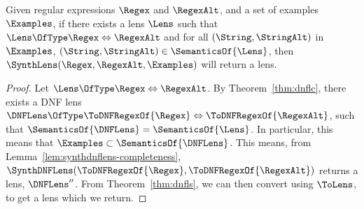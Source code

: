 \documentclass[acmsmall,screen]{acmart}
\begin{document}
\begin{theorem}
  Given regular expressions $\Regex$ and $\RegexAlt$, and a set
  of examples $\Examples$, if there exists a lens $\Lens$ such that
  $\Lens \OfType \Regex \Leftrightarrow \RegexAlt$ and for all
  $(\String,\StringAlt)$ in $\Examples$, $(\String,\StringAlt) \in
  \SemanticsOf{\Lens}$, then $\SynthLens(\Regex,\RegexAlt,\Examples)$ will
  return a lens.
\end{theorem}
\begin{proof}
  Let $\Lens \OfType \Regex \Leftrightarrow \RegexAlt$.  By
  Theorem~\ref{thm:dnflc}, there exists a DNF lens $\DNFLens \OfType \ToDNFRegexOf{\Regex}
  \Leftrightarrow \ToDNFRegexOf{\RegexAlt}$, such that $\SemanticsOf{\DNFLens} =
  \SemanticsOf{\Lens}$.  In particular, this means that $\Examples \subset
  \SemanticsOf{\DNFLens}$.  This means, from
  Lemma~\ref{lem:synthdnflens-completeness},
  $\SynthDNFLens(\ToDNFRegexOf{\Regex},\ToDNFRegexOf{\RegexAlt})$ returns a
  lens, $\DNFLens''$.  From Theorem~\ref{thm:dnfls}, we can then convert using
  $\ToLens$, to get a lens which we return.
\end{proof}

%
\end{document}
